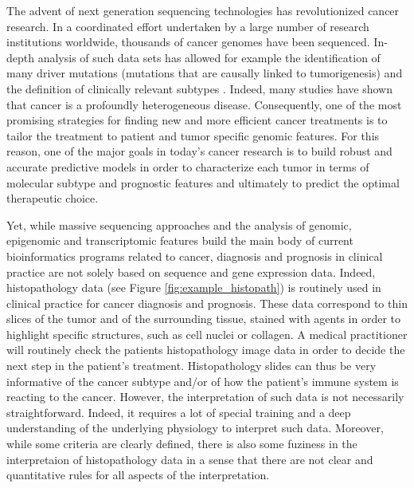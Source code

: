 \documentclass[a4paper,10pt]{article}
\begin{document}
The advent of next generation sequencing technologies has
revolutionized cancer research. In a coordinated effort undertaken by
a large number of research institutions worldwide, thousands of cancer
genomes have been sequenced. In-depth analysis of such data sets has
allowed for example the identification of many driver mutations
(mutations that are causally linked to tumorigenesis) and the
definition of clinically relevant subtypes \citep{Hudson2010}. Indeed,
many studies have shown that cancer is a profoundly heterogeneous
disease. Consequently, one of the most promising strategies for
finding new and more efficient cancer treatments is to
tailor the treatment to patient and tumor specific genomic
features. For this reason, one of the major goals in today’s cancer
research is to build robust and accurate predictive models in order to
characterize each tumor in terms of molecular subtype and prognostic
features and ultimately to predict the optimal therapeutic choice. 

Yet, while massive sequencing approaches and the analysis of genomic,
epigenomic and transcriptomic features build the main body of current
bioinformatics programs related to cancer, diagnosis and prognosis in
clinical practice are not solely based on sequence and gene expression
data. Indeed, histopathology data (see Figure
\ref{fig:example_histopath}) is routinely used in clinical
practice for cancer diagnosis and prognosis. These data  correspond to
thin slices of the tumor and of the surrounding tissue, stained with
agents in order to highlight specific structures, such as cell nuclei
or collagen. A medical practitioner will routinely check the patients
histopathology image data in order to decide the next step in the
patient's treatment. Histopathology slides can thus be very
informative of the cancer subtype and/or of how the patient's immune
system is reacting to the cancer. However, the interpretation of such
data is not necessarily straightforward. Indeed, it requires a lot of
special training and a deep understanding of the underlying physiology
to interpret such data. Moreover, while some criteria are clearly
defined, there is also some fuziness in the interpretaion of
histopathology data in a sense that there are not clear and
quantitative rules for all aspects of the interpretation. 
\end{document}
